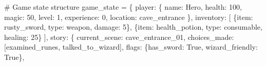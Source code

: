 \documentclass[
  letterpaper,
  DIV=11,
  numbers=noendperiod,
  oneside]{scrreprt}
\newenvironment{Shaded}{}{}
\newcommand{\CommentTok}[1]{\textcolor[rgb]{0.42,0.45,0.49}{#1}}
\newcommand{\DecValTok}[1]{\textcolor[rgb]{0.00,0.36,0.77}{#1}}
\newcommand{\NormalTok}[1]{\textcolor[rgb]{0.14,0.16,0.18}{#1}}
\newcommand{\OperatorTok}[1]{\textcolor[rgb]{0.14,0.16,0.18}{#1}}
\newcommand{\StringTok}[1]{\textcolor[rgb]{0.01,0.18,0.38}{#1}}
\newcommand{\VariableTok}[1]{\textcolor[rgb]{0.89,0.38,0.04}{#1}}
\begin{document}
\begin{Shaded}
\begin{Highlighting}[]
\CommentTok{\# Game state structure}
\NormalTok{game\_state }\OperatorTok{=}\NormalTok{ \{}
    \StringTok{\textquotesingle{}player\textquotesingle{}}\NormalTok{: \{}
        \StringTok{\textquotesingle{}name\textquotesingle{}}\NormalTok{: }\StringTok{\textquotesingle{}Hero\textquotesingle{}}\NormalTok{,}
        \StringTok{\textquotesingle{}health\textquotesingle{}}\NormalTok{: }\DecValTok{100}\NormalTok{,}
        \StringTok{\textquotesingle{}magic\textquotesingle{}}\NormalTok{: }\DecValTok{50}\NormalTok{,}
        \StringTok{\textquotesingle{}level\textquotesingle{}}\NormalTok{: }\DecValTok{1}\NormalTok{,}
        \StringTok{\textquotesingle{}experience\textquotesingle{}}\NormalTok{: }\DecValTok{0}\NormalTok{,}
        \StringTok{\textquotesingle{}location\textquotesingle{}}\NormalTok{: }\StringTok{\textquotesingle{}cave\_entrance\textquotesingle{}}
\NormalTok{    \},}
    \StringTok{\textquotesingle{}inventory\textquotesingle{}}\NormalTok{: [}
\NormalTok{        \{}\StringTok{\textquotesingle{}item\textquotesingle{}}\NormalTok{: }\StringTok{\textquotesingle{}rusty\_sword\textquotesingle{}}\NormalTok{, }\StringTok{\textquotesingle{}type\textquotesingle{}}\NormalTok{: }\StringTok{\textquotesingle{}weapon\textquotesingle{}}\NormalTok{, }\StringTok{\textquotesingle{}damage\textquotesingle{}}\NormalTok{: }\DecValTok{5}\NormalTok{\},}
\NormalTok{        \{}\StringTok{\textquotesingle{}item\textquotesingle{}}\NormalTok{: }\StringTok{\textquotesingle{}health\_potion\textquotesingle{}}\NormalTok{, }\StringTok{\textquotesingle{}type\textquotesingle{}}\NormalTok{: }\StringTok{\textquotesingle{}consumable\textquotesingle{}}\NormalTok{, }\StringTok{\textquotesingle{}healing\textquotesingle{}}\NormalTok{: }\DecValTok{25}\NormalTok{\}}
\NormalTok{    ],}
    \StringTok{\textquotesingle{}story\textquotesingle{}}\NormalTok{: \{}
        \StringTok{\textquotesingle{}current\_scene\textquotesingle{}}\NormalTok{: }\StringTok{\textquotesingle{}cave\_entrance\_01\textquotesingle{}}\NormalTok{,}
        \StringTok{\textquotesingle{}choices\_made\textquotesingle{}}\NormalTok{: [}\StringTok{\textquotesingle{}examined\_runes\textquotesingle{}}\NormalTok{, }\StringTok{\textquotesingle{}talked\_to\_wizard\textquotesingle{}}\NormalTok{],}
        \StringTok{\textquotesingle{}flags\textquotesingle{}}\NormalTok{: \{}\StringTok{\textquotesingle{}has\_sword\textquotesingle{}}\NormalTok{: }\VariableTok{True}\NormalTok{, }\StringTok{\textquotesingle{}wizard\_friendly\textquotesingle{}}\NormalTok{: }\VariableTok{True}\NormalTok{\},}

\end{Highlighting}
\end{Shaded}
\end{document}
